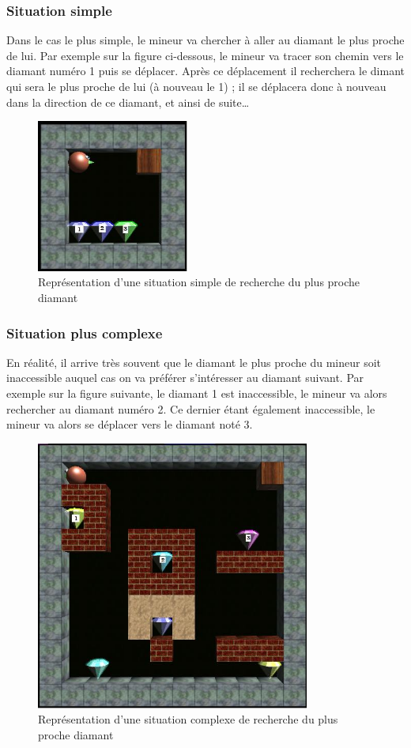 \documentclass[a4paper,11pt]{article}
\begin{document}
		\subsubsection{Situation simple}
		
Dans le cas le plus simple, le mineur va chercher à aller au diamant le plus proche de lui. Par exemple sur la figure ci-dessous, le mineur va tracer son chemin vers le diamant numéro 1 puis se déplacer. Après ce déplacement il recherchera le dimant qui sera le plus proche de lui (à nouveau le 1) ; il se déplacera donc à nouveau dans la direction de ce diamant, et ainsi de suite…

		\begin{figure}[h]
			\center
			\includegraphics[width=5cm]{simple1}
			\caption{\label{simpleRechercheDiamant} Représentation d'une situation simple de recherche du plus proche diamant}
		\end{figure}
		
		\subsubsection{Situation plus complexe}
		
En réalité, il arrive très souvent que le diamant le plus proche du mineur soit inaccessible auquel cas on va préférer s’intéresser au diamant suivant. Par exemple sur la figure suivante, le diamant 1 est inaccessible, le mineur va alors rechercher au diamant numéro 2. Ce dernier étant également inaccessible, le mineur va alors se déplacer vers le diamant noté 3.
	
		\begin{figure}[h]
			\center
			\includegraphics[width=9cm]{simple2}
			\caption{\label{complexeRechercheDiamant} Représentation d'une situation complexe de recherche du plus proche diamant}
		\end{figure}
		
\end{document}
